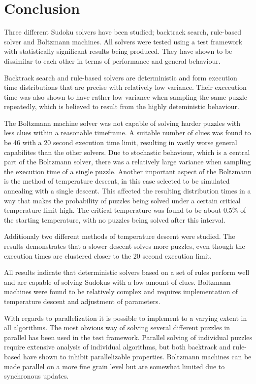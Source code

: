 \documentclass[a4paper,11pt]{kth-mag}
\begin{document}
\chapter{Conclusion}
Three different Sudoku solvers have been studied; backtrack search, rule-based solver and Boltzmann machines.
All solvers were tested using a test framework with statistically significant results being produced.
They have shown to be dissimilar to each other in terms of performance and general behaviour.

Backtrack search and rule-based solvers are deterministic and form execution time distributions that are precise with relatively low variance.
Their excecution time was also shown to have rather low variance when sampling the same puzzle repeatedly, which is believed to result from the highly deteministic behaviour.

The Boltzmann machine solver was not capable of solving harder puzzles with less clues within a reasonable timeframe.
A suitable number of clues was found to be 46 with a 20 second execution time limit, resulting in vastly worse general capabilites than the other solvers.
Due to stochastic behaviour, which is a central part of the Boltzmann solver, there was a relatively large variance when sampling the execution time of a single puzzle.
Another important aspect of the Boltzmann is the method of temperature descent, in this case selected to be simulated annealing with a single descent.
This affected the resulting distribution times in a way that makes the probability of puzzles being solved under a certain critical temperature limit high.
The critical temperature was found to be about 0.5\% of the starting temperature, with no puzzles being solved after this interval.

Additionaly two different methods of temperature descent were studied.
The results demonstrates that a slower descent solves more puzzles, even though the execution times are clustered closer to the 20 second execution limit.

All results indicate that deterministic solvers based on a set of rules perform well and are capable of solving Sudokus with a low amount of clues.
Boltzmann machines were found to be relatively complex and requires implementation of temperature descent and adjustment of parameters.

With regards to parallelization it is possible to implement to a varying extent in all algorithms.
The most obvious way of solving several different puzzles in parallel has been used in the test framework.
Parallel solving of individual puzzles require extensive analysis of individual algorithms, but both backtrack and rule-based have shown to inhibit parallelizable properties.
Boltzmann machines can be made parallel on a more fine grain level but are somewhat limited due to synchronous updates.
\end{document}
